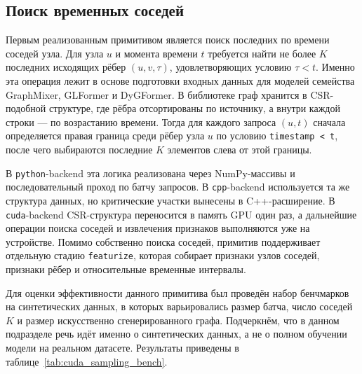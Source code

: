 \documentclass[a4paper,12pt]{extarticle}
\begin{document}
  \subsection{Поиск временных соседей}

  Первым реализованным примитивом является поиск последних по времени соседей узла. Для узла $u$ и момента времени $t$ требуется найти не более $K$ последних
  исходящих рёбер $(u, v, \tau)$, удовлетворяющих условию $\tau < t$. Именно эта операция лежит в основе подготовки входных данных для моделей семейства GraphMixer,
  GLFormer и DyGFormer. В библиотеке граф хранится в CSR-подобной структуре, где рёбра отсортированы по источнику, а внутри каждой строки --- по возрастанию времени.
  Тогда для каждого запроса $(u,t)$ сначала определяется правая граница среди рёбер узла $u$ по условию \texttt{timestamp < t}, после чего выбираются последние $K$
  элементов слева от этой границы.

  В \texttt{python}-backend эта логика реализована через NumPy-массивы и последовательный проход по батчу запросов. В \texttt{cpp}-backend используется та же
  структура данных, но критические участки вынесены в C++-расширение. В \texttt{cuda}-backend CSR-структура переносится в память GPU один раз, а дальнейшие операции
  поиска соседей и извлечения признаков выполняются уже на устройстве. Помимо собственно поиска соседей, примитив поддерживает отдельную стадию \texttt{featurize},
  которая собирает признаки узлов соседей, признаки рёбер и относительные временные интервалы.

  Для оценки эффективности данного примитива был проведён набор бенчмарков на синтетических данных, в которых варьировались размер батча, число соседей $K$ и размер
  искусственно сгенерированного графа. Подчеркнём, что в данном подразделе речь идёт именно о синтетических данных, а не о полном обучении модели на реальном
  датасете. Результаты приведены в таблице~\ref{tab:cuda_sampling_bench}.
\end{document}
